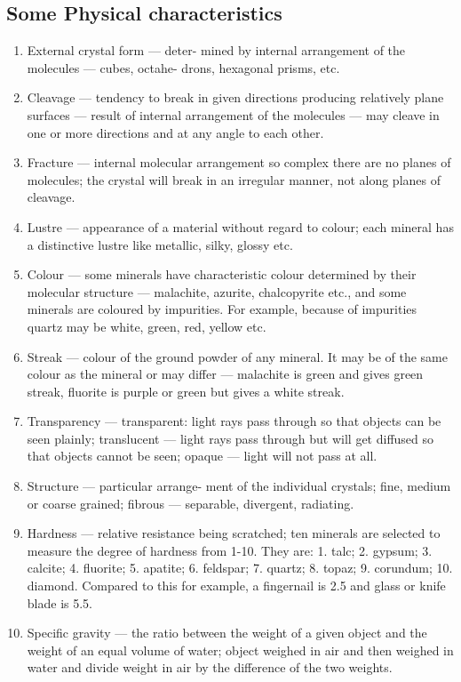 \documentclass[8pt, a4paper, oneside, twocolumn]{extarticle}
\begin{document}
\subsection{Some Physical characteristics}
\begin{enumerate}
  \item External crystal form — deter-
  mined by internal arrangement of
  the molecules — cubes, octahe-
  drons, hexagonal prisms, etc. 
  \item Cleavage — tendency to break in given directions producing relatively plane surfaces — result of internal arrangement of the molecules — may cleave in one or more directions and at any angle to each other. 
  \item Fracture — internal molecular arrangement so complex there are no planes of molecules; the crystal will break in an irregular manner, not along planes of cleavage. 
  \item Lustre — appearance of a material without regard to colour; each mineral has a distinctive lustre like metallic, silky, glossy etc. 
  \item Colour — some minerals have characteristic colour determined by their molecular structure — malachite, azurite, chalcopyrite etc., and some minerals are coloured by impurities. For example, because of impurities quartz may be white, green, red, yellow etc. 
  \item Streak — colour of the ground powder of any mineral. It may be of the same colour as the mineral or may differ — malachite is green and gives green streak, fluorite is purple or green but gives a white streak. 
  \item Transparency — transparent: light rays pass through so that objects can be seen plainly; translucent — light rays pass through but will get diffused so that objects cannot be seen; opaque — light will not pass at all. 
  \item Structure — particular arrange- ment of the individual crystals; fine, medium or coarse grained; fibrous — separable, divergent, radiating. 
  \item Hardness — relative resistance being scratched; ten minerals are selected to measure the degree of hardness from 1-10. They are: 1. talc; 2. gypsum; 3. calcite; 4. fluorite; 5. apatite; 6. feldspar; 7. quartz; 8. topaz; 9. corundum; 10. diamond. Compared to this for example, a fingernail is 2.5 and glass or knife blade is 5.5. 
  \item Specific gravity — the ratio between the weight of a given object and the weight of an equal volume of water; object weighed in air and then weighed in water and divide weight in air by the difference of the two weights.
\end{enumerate}
\end{document}
